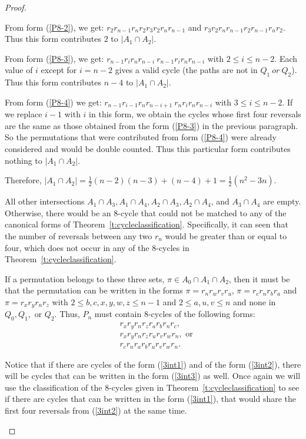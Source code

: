 \documentclass[final]{dmtcs-episciences}
\numberwithin{equation}{section}
\begin{document}
\begin{proof}
\begin{description}
From form (\ref{P8-2}), we get: $r_{2}r_{n-1}r_{n}r_{2}r_{3}r_{2}r_{n}r_{n-1}$ and
$r_{3}r_{2}r_{n}r_{n-1}r_{2}r_{n-1}r_{n}r_{2}$. Thus this form contributes $2$ to $|A_1 \cap A_2|$. 

From form (\ref{P8-3}), we get: $r_{n-1}r_{i}r_{n}r_{n-i} \ r_{n-1}r_{i}r_{n}r_{n-i}$ with $2 \leq i \leq n-2$. Each value of $i$ except for $i=n-2$ gives a valid cycle (the paths are not in $Q_1 \ or \ Q_2$). Thus this form contributes $n-4$ to $|A_1 \cap A_2|$. 

From form (\ref{P8-4}) we get: $r_{n-1}r_{i-1}r_{n}r_{n-i+1} \ r_{n}r_{i}r_{n}r_{n-i}$ with $3 \leq i \leq n-2$. If we replace $i-1$ with $i$ in this form, we obtain the cycles whose first four reversals are the same as those obtained from the form (\ref{P8-3}) in the previous paragraph. So the permutations that were contributed from form (\ref{P8-4}) were already considered and would be double counted. Thus this particular form contributes nothing to $|A_1 \cap A_2|$.

Therefore, $|A_1 \cap A_2| = \frac{1}{2}(n-2)(n-3) + (n-4)+1 = \frac{1}{2}(n^2-3n)$.

\item[Other intersections of two sets.] All other intersections $A_1 \cap A_3,A_1 \cap A_4,A_2 \cap A_3,A_2 \cap A_4$, and $A_3 \cap A_4$ are empty. Otherwise, there would be an 8-cycle that could not be matched to any of the canonical forms of Theorem~\ref{t:cycleclassification}. Specifically, it can seen that the number of reversals between any two $r_n$ would be greater than or equal to four, which does not occur in any of the 8-cycles in Theorem~\ref{t:cycleclassification}.

\item[$|A_0 \cap A_1 \cap A_2|$.] If a permutation belongs to these three sets, $\pi\in A_0\cap A_1\cap A_2$, then it must be that the permutation can be written in the forms $\pi=r_n r_w r_v r_u$, $\pi=r_c r_n r_b r_a$ and $\pi=r_x r_y r_n r_z$ with $2 \leq b,c,x,y,w,z \leq n-1$ and $2 \leq a,u,v \leq n$ and none in $Q_0, Q_1,$ or $Q_2$. Thus, $P_n$ must contain 8-cycles of the following forms:
\begin{align}
    \label{3int1} &r_x r_y r_n r_z r_a r_b r_n r_c, \\
    \label{3int2} &r_x r_y r_n r_z r_u r_v r_w r_n, \text{ or}\\
    \label{3int3} &r_c r_n r_a r_b r_u r_v r_w r_n.
\end{align}

Notice that if there are cycles of the form (\ref{3int1}) and of the form (\ref{3int2}), there will be cycles that can be written in the form (\ref{3int3}) as well. Once again we will use the classification of the 8-cycles given in Theorem~\ref{t:cycleclassification} to see if there are cycles that can be written in the form (\ref{3int1}), that would share the first four reversals from (\ref{3int2}) at the same time. 


\end{description}
\end{proof}
\end{document}
